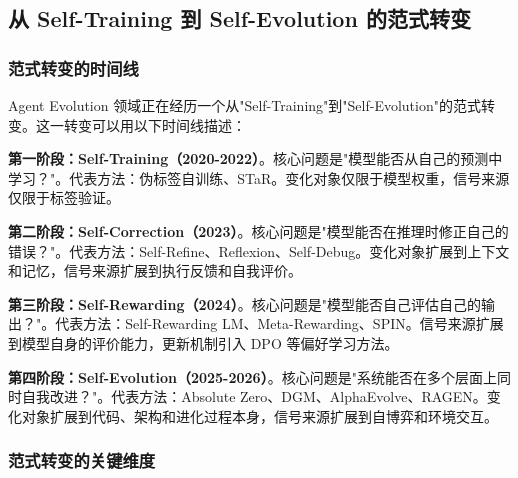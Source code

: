 \subsection{从 Self-Training 到 Self-Evolution 的范式转变}\label{sec:intro-paradigm}

\subsubsection{范式转变的时间线}

Agent Evolution 领域正在经历一个从"Self-Training"到"Self-Evolution"的范式转变。这一转变可以用以下时间线描述：

\textbf{第一阶段：Self-Training（2020-2022）}。核心问题是"模型能否从自己的预测中学习？"。代表方法：伪标签自训练、STaR。变化对象仅限于模型权重，信号来源仅限于标签验证。

\textbf{第二阶段：Self-Correction（2023）}。核心问题是"模型能否在推理时修正自己的错误？"。代表方法：Self-Refine、Reflexion、Self-Debug。变化对象扩展到上下文和记忆，信号来源扩展到执行反馈和自我评价。

\textbf{第三阶段：Self-Rewarding（2024）}。核心问题是"模型能否自己评估自己的输出？"。代表方法：Self-Rewarding LM、Meta-Rewarding、SPIN。信号来源扩展到模型自身的评价能力，更新机制引入 DPO 等偏好学习方法。

\textbf{第四阶段：Self-Evolution（2025-2026）}。核心问题是"系统能否在多个层面上同时自我改进？"。代表方法：Absolute Zero、DGM、AlphaEvolve、RAGEN。变化对象扩展到代码、架构和进化过程本身，信号来源扩展到自博弈和环境交互。

\subsubsection{范式转变的关键维度}

\begin{table}[htbp]
\centering
\caption{从 Self-Training 到 Self-Evolution 的范式转变。}
\label{tab:paradigm-shift}
\end{table}

